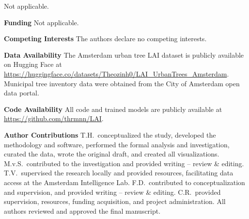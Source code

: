 
\backmatter

{}%

Not applicable.

{}%

\noindent\textbf{Funding}
Not applicable.

\noindent\textbf{Competing Interests}
The authors declare no competing interests.

\noindent\textbf{Data Availability}
The Amsterdam urban tree LAI dataset is publicly available on Hugging Face at \url{https://huggingface.co/datasets/Theozinh0/LAI_UrbanTrees_Amsterdam}. Municipal tree inventory data were obtained from the City of Amsterdam open data portal.

\noindent\textbf{Code Availability}
All code and trained models are publicly available at \url{https://github.com/thrmnn/LAI}.

\noindent\textbf{Author Contributions}
T.H.\ conceptualized the study, developed the methodology and software, performed the formal analysis and investigation, curated the data, wrote the original draft, and created all visualizations. M.v.S.\ contributed to the investigation and provided writing -- review \& editing. T.V.\ supervised the research locally and provided resources, facilitating data access at the Amsterdam Intelligence Lab. F.D.\ contributed to conceptualization and supervision, and provided writing -- review \& editing. C.R.\ provided supervision, resources, funding acquisition, and project administration. All authors reviewed and approved the final manuscript.
